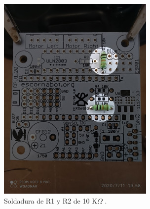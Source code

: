 \documentclass{article}
\begin{document}
\begin{figure}[H]
\begin{subfigure}[t]{0.3\textwidth}
        \includegraphics[width=0.9\columnwidth, height=1.2\columnwidth]{images/CPU/cpu_resistencias_1.jpg}
        \caption{Soldadura de R1 y R2 de 10 K$\Omega$ .}
        \label{fig:cpu_resistencias_1}
    \end{subfigure}%
    \begin{subfigure}[t]{0.3\textwidth}
        \centering

\end{subfigure}
\end{figure}
\end{document}
